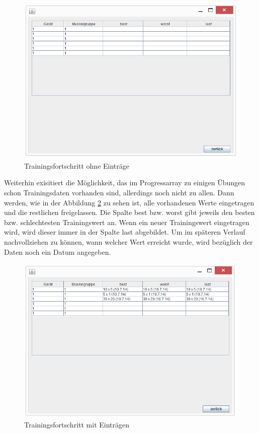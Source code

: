 \begin{figure}[h]
\includegraphics[width=1\hsize]{./images/fortschritt-leer.png}
\caption{Trainingsfortschritt ohne Einträge}
\label{empty}
\end{figure}
\newpage
Weiterhin exisitiert die Möglichkeit, das im Progressarray zu einigen Übungen schon Trainingsdaten vorhanden sind, allerdings noch nicht zu allen. Dann werden, wie in der Abbildung \ref{full} zu sehen ist, alle vorhandenen Werte eingetragen und die restlichen freigelassen. Die Spalte best bzw. worst gibt jeweils den besten bzw. schlechtesten Trainingswert an. Wenn ein neuer Trainingswert eingetragen wird, wird dieser immer in der Spalte last abgebildet. Um im späteren Verlauf nachvollziehen zu können, wann welcher Wert erreicht wurde, wird bezüglich der Daten noch ein Datum angegeben.

\begin{figure}[h]
\includegraphics[width=1\hsize]{./images/fortschritt-mit-eingabe.png}
\caption{Trainingsfortschritt mit Einträgen}
\label{full}
\end{figure}
\newpage
